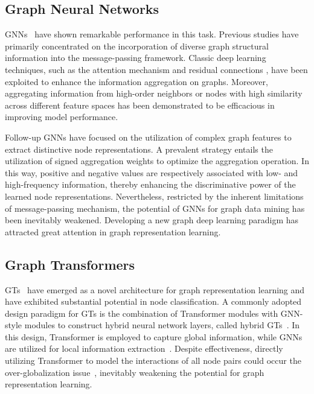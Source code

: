 

\subsection{Graph Neural Networks}
GNNs~\cite{gnn3,gnn2,rlp,pamt,ncn} have shown remarkable performance in this task. 
Previous studies \cite{gat,jknet,sgc,appnp} have primarily concentrated on the incorporation of diverse graph structural information into the message-passing framework. 
Classic deep learning techniques, such as the attention mechanism \cite{gat,gatv2} and residual connections \cite{jknet,gcnii}, have been exploited to enhance the information aggregation on graphs. 
Moreover, aggregating information from high-order neighbors \cite{appnp,mixhop,h2gnn} or nodes with high similarity across different feature spaces \cite{geomgcn} has been demonstrated to be efficacious in improving model performance.

Follow-up GNNs have focused on the utilization of complex graph features to extract distinctive node representations. 
A prevalent strategy entails the utilization of signed aggregation weights \cite{fagcn,gprgnn,acmgnn,glognn} to optimize the aggregation operation. 
In this way, positive and negative values are respectively associated with low- and high-frequency information, thereby enhancing the discriminative power of the learned node representations.
Nevertheless, restricted by the inherent limitations of message-passing mechanism, the potential of GNNs for graph data mining has been inevitably weakened.
Developing a new graph deep learning paradigm has attracted great attention in graph representation learning. 



\subsection{Graph Transformers}
GTs~\cite{polynormer,agt,cob} have emerged as a novel architecture for graph representation learning and have exhibited substantial potential in node classification. 
A commonly adopted design paradigm for GTs is the combination of Transformer modules with GNN-style modules to construct hybrid neural network layers, called hybrid GTs~\cite{nodeformer,sgformer,specformer}. 
In this design, Transformer is employed to capture global information, while GNNs are utilized for local information extraction~\cite{graphgps,polynormer,signgt}.
Despite effectiveness, directly utilizing Transformer to model the interactions of all node pairs could occur the over-globalization issue~\cite{cob}, inevitably weakening the potential for graph representation learning.

